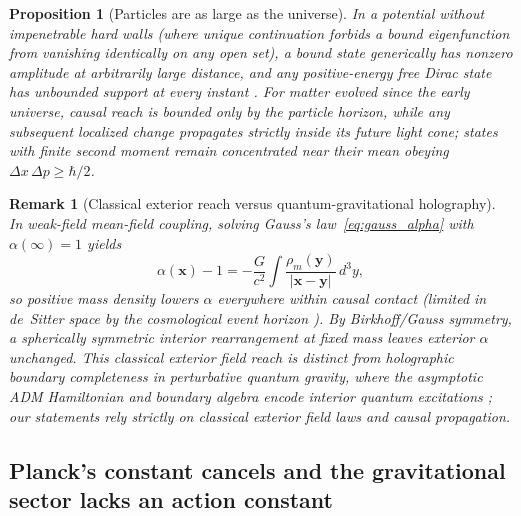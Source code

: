 \documentclass[aps,prd,onecolumn,tightenlines,nofootinbib,notitlepage,10pt,floatfix]{revtex4-2}
\theoremstyle{indentedtheorem}
\newtheorem{proposition}{Proposition}
\newtheorem{remark}{Remark}
\begin{document}
\begin{proposition}[Particles are as large as the universe]\label{prop:reach}
In a potential without impenetrable hard walls (where unique continuation forbids a bound eigenfunction from vanishing identically on any open set), a bound state generically has nonzero amplitude at arbitrarily large distance, and any positive-energy free Dirac state has unbounded support at every instant \citep{Hegerfeldt1998Instantaneous}. For matter evolved since the early universe, causal reach is bounded only by the particle horizon, while any subsequent localized change propagates strictly inside its future light cone; states with finite second moment remain concentrated near their mean obeying $\Delta x\,\Delta p\ge\hbar/2$.
\end{proposition}

\begin{remark}[Classical exterior reach versus quantum-gravitational holography]\label{rem:reach}
In weak-field mean-field coupling, solving Gauss's law~\eqref{eq:gauss_alpha} with $\alpha(\infty)=1$ yields
\begin{equation}
    \alpha(\mathbf{x}) - 1 = -\frac{G}{c^2}\int\frac{\rho_m(\mathbf{y})}{|\mathbf{x}-\mathbf{y}|}\,d^3y ,
    \label{eq:static_density_clock_field}
\end{equation}
so positive mass density lowers $\alpha$ everywhere within causal contact (limited in de~Sitter space by the cosmological event horizon \citep{Gibbons1977Cosmological}). By Birkhoff/Gauss symmetry, a spherically symmetric interior rearrangement at fixed mass leaves exterior $\alpha$ unchanged. This classical exterior field reach is distinct from holographic boundary completeness in perturbative quantum gravity, where the asymptotic ADM Hamiltonian and boundary algebra encode interior quantum excitations \citep{Bousso2002,Marolf2009,Laddha2021,Raju2022}; our statements rely strictly on classical exterior field laws and causal propagation.
\end{remark}

\subsection{Planck's constant cancels and the gravitational sector lacks an action constant}
\label{sec:hbar_cancels}
\end{document}
